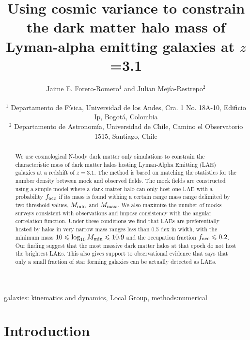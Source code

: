 \documentclass[usenatbib]{mn2e}
\begin{document}
\title[Dark Matter Halo Mass for LAEs  at $z=3.1$]{Using cosmic
  variance to constrain the dark matter halo mass of Lyman-alpha
  emitting galaxies at $z$=3.1} 
  
\author[~J.~E. Forero-Romero and J. Mejia]{
\parbox[t]{\textwidth}{\raggedright 
Jaime E. Forero-Romero$^{1}$ and
Julian Mej\'ia-Restrepo$^{2}$ 
}
\vspace*{6pt}\\
$^{1}$ Departamento de F\'{i}sica, Universidad de los Andes, Cra. 1
No. 18A-10, Edificio Ip, Bogot\'a, Colombia \\
$^{2}$ Departamento de Astronom\'{i}a, Universidad de Chile, Camino el Observatorio 1515, Santiago, Chile}

\maketitle

\begin{abstract}
We use cosmological N-body dark matter only simulations to constrain the
characteristic mass of dark matter halos hosting Lyman-Alpha Emitting
(LAE) galaxies at a redshift of $z=3.1$. The method is based on
matching the statistics for the number density between mock and
observed fields. The mock fields are constructed using a simple model
where a dark matter halo can only host one LAE with a probability
$f_{\rm occ}$ if its mass is found withing a certain range mass range
delimited by two threshold values, $M_{\rm min}$ and $M_{\rm max}$. 
We also maximize the number of mocks surveys consistent with
observations and impose consistency with the angular correlation
function. Under these conditions we find that LAEs are preferentially
hosted by halos in very narrow mass ranges less than 0.5 dex in width,
with the minimum mass $10\leq \log_{10}M_{\rm min}\leq 10.9$ and the
occupation fraction $f_{\rm   occ}\leq 0.2$.  Our finding suggest that
the most massive dark matter halos at that epoch do not host the
brightest LAEs. This also gives support to observational evidence that
says that only a small fraction of star forming galaxies can be
actually detected as LAEs.
\end{abstract}

\begin{keywords}
{galaxies: kinematics and dynamics, Local Group, methods:numerical}
\end{keywords}


\section{Introduction}
\end{document}
